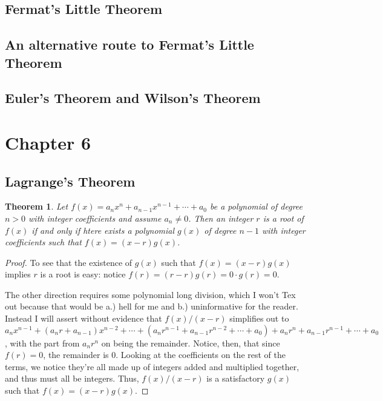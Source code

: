 \documentclass{article}
\newtheorem{thm}{Theorem}[section]
\numberwithin{equation}{thm}
\begin{document}



\subsection*{Fermat's Little Theorem}




\subsection*{An alternative route to Fermat's Little Theorem}




\subsection*{Euler's Theorem and Wilson's Theorem}





\pagebreak



\setcounter{section}{5}

\section{Chapter 6}

\subsection*{Lagrange's Theorem}

\begin{thm} \label{6.1}
  Let $f(x) = a_n x^n + a_{n-1} x^{n-1} + \cdots + a_0$ be a polynomial of degree $n > 0$ with integer coefficients and assume $a_n \neq 0$. Then an integer $r$ is a root of $f(x)$ if and only if htere exists a polynomial $g(x)$ of degree $n-1$ with integer coefficients such that $f(x) = (x-r)g(x)$.
\end{thm}

\begin{proof}
  To see that the existence of $g(x)$ such that $f(x) = (x-r) g(x)$ implies $r$ is a root is easy: notice $f(r) = (r-r) g(r) = 0 \cdot g(r) = 0$.

  The other direction requires some polynomial long division, which I won't Tex out because that would be a.) hell for me and b.) uninformative for the reader. Instead I will assert without evidence that $f(x) / (x-r)$ simplifies out to $a_n x^{n-1} + (a_n r + a_{n-1})x^{n-2} + \cdots + (a_n r^{n-1} + a_{n-1} r^{n-2} + \cdots + a_0) + a_n r^n + a_{n-1}r^{n-1} + \cdots + a_0$, with the part from $a_n r^n$ on being the remainder. Notice, then, that since $f(r) = 0$, the remainder is $0$. Looking at the coefficients on the rest of the terms, we notice they're all made up of integers added and multiplied together, and thus must all be integers. Thus, $f(x) / (x-r)$ is a satisfactory $g(x)$ such that $f(x) = (x-r) g(x)$.
\end{proof}
\end{document}
